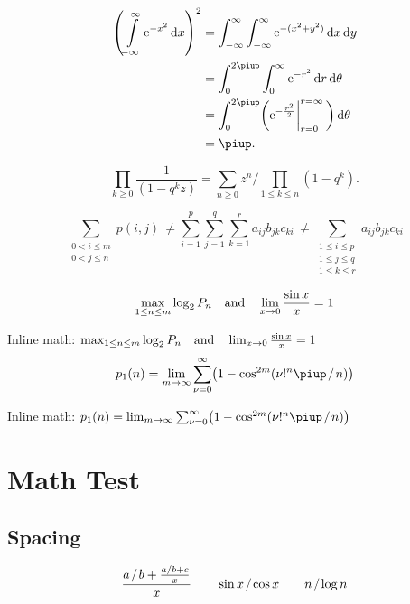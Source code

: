 \documentclass[12pt, a4paper, oneside]{article}
\newcommand{\mathup}[1]{\mathrm{#1}}
\newcommand*{\divslash}{%
	\mathbin{%
		\nonscript\mskip-2mu / \nonscript\mskip-2mu%
	}%
}  %
\theoremstyle{Plain}
\theoremstyle{Definition}
\theoremstyle{Remark}
\begin{document}
\begin{appendix}

\begin{align*}
\begin{aligned}
\left( \int\limits_{-\infty}^\infty \mathup{e}^{-x^2}\,\mathup{d}x \right)^2
&=\int_{-\infty}^\infty\int_{-\infty}^\infty \mathup{e}^{-(x^2+y^2)}\,\mathup{d}x\,\mathup{d}y\\
&=\int_0^{2\piup}\int_0^\infty \mathup{e}^{-r^2}\,\mathup{d}r\,\mathup{d}\theta\\
&=\int_0^{2\piup}\biggl(\mathup{e}^{-\frac{r^2}{2}}\biggl|_{r=0}^{r=\infty}\,\biggr)\,\mathup{d}\theta\\
&=\piup.
\end{aligned}
\end{align*}



$$\prod_{k\ge0}\frac{1}{(1-q^kz)}=
\sum_{n\ge0}z^n \bigg/ \!\!\prod_{1\le k\le n}(1-q^k).$$

$$\sum_{\substack{\scriptstyle 0< i\le m\\\scriptstyle0<j\le n}}p(i,j) \,\ne
%
%
\sum_{i=1}^p \sum_{j=1}^q \sum_{k=1}^r a_{ij} b_{jk} c_{ki} \,\ne
%
\sum_{\substack{\scriptstyle 1\le i\le p \\ \scriptstyle 1\le j\le q\\
		\scriptstyle 1\le k\le r}} a_{ij} b_{jk} c_{ki}$$

\medskip
$$\max_{1\le n\le m}\log_2P_n \quad \hbox{and} \quad
\lim_{x\to0}\frac{\sin x}{x}=1$$

\medskip
Inline math:
$\max_{1\le n\le m}\log_2P_n \quad \hbox{and} \quad
\lim_{x\to0}\frac{\sin x}{x}=1$
$$p_1(n)=\lim_{m\to\infty}\sum_{\nu=0}^\infty\bigl(1-\cos^{2m}(\nu!^n\piup \divslash n)\bigr)$$

\medskip
Inline math:
$p_1(n)=\lim_{m\to\infty}\sum_{\nu=0}^\infty\bigl(1-\cos^{2m}(\nu!^n\piup \divslash n)\bigr)$

\endgroup

\clearpage

\section{Math Test \showfamily}

\subsection{Spacing}

$$\frac{a \divslash b + \frac{a \divslash b + c}{x}}{x} \qquad \sin x \divslash \cos x \qquad n \divslash \log n$$


\end{appendix}
\end{document}
